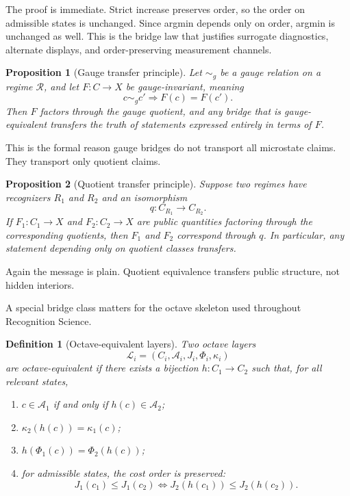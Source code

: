 \documentclass[11pt]{article}
\newtheorem{definition}{Definition}
\newtheorem{proposition}{Proposition}
\begin{document}
\noindent
The proof is immediate. Strict increase preserves order, so the order on admissible states is unchanged. Since argmin depends only on order, argmin is unchanged as well. This is the bridge law that justifies surrogate diagnostics, alternate displays, and order-preserving measurement channels.

\begin{proposition}[Gauge transfer principle]
Let $\sim_g$ be a gauge relation on a regime $\mathcal{R}$, and let $F:C\to X$ be gauge-invariant, meaning
\[
c\sim_g c' \Longrightarrow F(c)=F(c').
\]
Then $F$ factors through the gauge quotient, and any bridge that is gauge-equivalent transfers the truth of statements expressed entirely in terms of $F$.
\end{proposition}

\noindent
This is the formal reason gauge bridges do not transport all microstate claims. They transport only quotient claims.

\begin{proposition}[Quotient transfer principle]
Suppose two regimes have recognizers $R_1$ and $R_2$ and an isomorphism
\[
q:C_{R_1}\to C_{R_2}.
\]
If $F_1:C_1\to X$ and $F_2:C_2\to X$ are public quantities factoring through the corresponding quotients, then $F_1$ and $F_2$ correspond through $q$. In particular, any statement depending only on quotient classes transfers.
\end{proposition}

\noindent
Again the message is plain. Quotient equivalence transfers public structure, not hidden interiors.

A special bridge class matters for the octave skeleton used throughout Recognition Science.

\begin{definition}[Octave-equivalent layers]
Two octave layers
\[
\mathcal{L}_i=(C_i,\mathcal{A}_i,J_i,\Phi_i,\kappa_i)
\]
are octave-equivalent if there exists a bijection $h:C_1\to C_2$ such that, for all relevant states,
\begin{enumerate}
    \item $c\in\mathcal{A}_1$ if and only if $h(c)\in\mathcal{A}_2$;
    \item $\kappa_2(h(c))=\kappa_1(c)$;
    \item $h(\Phi_1(c))=\Phi_2(h(c))$;
    \item for admissible states, the cost order is preserved:
    \[
    J_1(c_1)\le J_1(c_2)
    \Longleftrightarrow
    J_2(h(c_1))\le J_2(h(c_2)).
    \]
\end{enumerate}
\end{definition}
\end{document}
